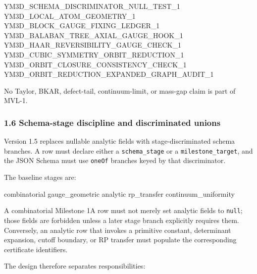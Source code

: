 \documentclass[
]{article}
\newenvironment{Shaded}{}{}
\newcommand{\NormalTok}[1]{#1}
\begin{document}
\begin{Shaded}
\begin{Highlighting}[]
\NormalTok{YM3D\_SCHEMA\_DISCRIMINATOR\_NULL\_TEST\_1}
\NormalTok{YM3D\_LOCAL\_ATOM\_GEOMETRY\_1}
\NormalTok{YM3D\_BLOCK\_GAUGE\_FIXING\_LEDGER\_1}
\NormalTok{YM3D\_BALABAN\_TREE\_AXIAL\_GAUGE\_HOOK\_1}
\NormalTok{YM3D\_HAAR\_REVERSIBILITY\_GAUGE\_CHECK\_1}
\NormalTok{YM3D\_CUBIC\_SYMMETRY\_ORBIT\_REDUCTION\_1}
\NormalTok{YM3D\_ORBIT\_CLOSURE\_CONSISTENCY\_CHECK\_1}
\NormalTok{YM3D\_ORBIT\_REDUCTION\_EXPANDED\_GRAPH\_AUDIT\_1}
\end{Highlighting}
\end{Shaded}

No Taylor, BKAR, defect-tail, continuum-limit, or mass-gap claim is part
of MVL-1.

\subsubsection{1.6 Schema-stage discipline and discriminated
unions}\label{schema-stage-discipline-and-discriminated-unions}

Version 1.5 replaces nullable analytic fields with stage-discriminated
schema branches. A row must declare either a \texttt{schema\_stage} or a
\texttt{milestone\_target}, and the JSON Schema must use \texttt{oneOf}
branches keyed by that discriminator.

The baseline stages are:

\begin{Shaded}
\begin{Highlighting}[]
\NormalTok{combinatorial}
\NormalTok{gauge\_geometric}
\NormalTok{analytic}
\NormalTok{rp\_transfer}
\NormalTok{continuum\_uniformity}
\end{Highlighting}
\end{Shaded}

A combinatorial Milestone 1A row must not merely set analytic fields to
\texttt{null}; those fields are forbidden unless a later stage branch
explicitly requires them. Conversely, an analytic row that invokes a
primitive constant, determinant expansion, cutoff boundary, or RP
transfer must populate the corresponding certificate identifiers.

The design therefore separates responsibilities:
\end{document}
